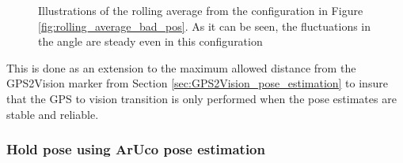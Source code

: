 \documentclass[../Head/report.tex]{subfiles}
\begin{document}
\begin{figure}[H]
\begin{subfigure}[t]{.30\textwidth}
        \caption{}
        \label{fig:rolling_average_in_yaw_test2}
    \end{subfigure}
    \caption{Illustrations of the rolling average from the configuration in Figure \ref{fig:rolling_average_bad_pos}. As it can be seen, the fluctuations in the angle are steady even in this configuration}
    \label{fig:rolling_average_angle_test2}
\end{figure}  

This is done as an extension to the maximum allowed distance from the GPS2Vision marker from Section \ref{sec:GPS2Vision_pose_estimation} to insure that the GPS to vision transition is only performed when the pose estimates are stable and reliable. 

\subsubsection{Hold pose using ArUco pose estimation}
\label{sec:hold_pose_using_aruco_pose_estimation}
\end{document}
